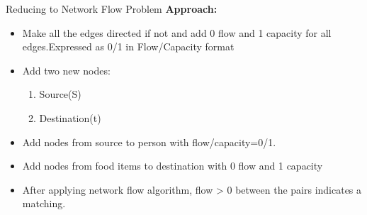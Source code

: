 \documentclass{beamer}
\begin{document}
\begin{frame}{Reducing to Network Flow Problem}
\textbf{Approach: }\\
    \begin{itemize}
        \item Make all the edges directed if not and add 0 flow and 1 capacity for all edges.Expressed as 0/1 in Flow/Capacity format
        \pause
        \item Add two new nodes: 
        \pause
        \begin{enumerate}
            \item Source(S)
            \item Destination(t)
        \end{enumerate}
        \pause
        \item 
        Add nodes from source to person with flow/capacity=0/1.
        \pause
        \item 
        Add nodes from food items to destination with 0 flow and 1 capacity
        \pause
        \item After applying network flow algorithm, flow \textgreater{}
        0 between the pairs indicates a matching.
        
    \end{itemize}
    
\end{frame}
\end{document}
